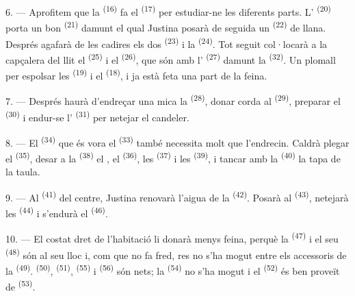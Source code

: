 6. --- Aprofitem que la  \textsuperscript{(16)} fa el
 \textsuperscript{(17)} per estudiar-ne les diferents parts.
L' \textsuperscript{(20)} porta un bon 
\textsuperscript{(21)} damunt el qual Justina posarà de seguida un
 \textsuperscript{(22)} de llana. Després agafarà de les cadires
els dos  \textsuperscript{(23)} i la 
\textsuperscript{(24)}. Tot seguit col·locarà a la capçalera del llit el
 \textsuperscript{(25)} i el 
\textsuperscript{(26)}, que són amb l' \textsuperscript{(27)}
damunt la  \textsuperscript{(32)}. Un plomall per espolsar
les  \textsuperscript{(19)} i el 
\textsuperscript{(18)}, i ja està feta una part de la feina.

7. --- Després haurà d'endreçar una mica la 
\textsuperscript{(28)}, donar corda al 
\textsuperscript{(29)}, preparar el  \textsuperscript{(30)} i
endur-se l' \textsuperscript{(31)} per netejar el candeler.

\VUsaut{5.0mm}
\VUsaut{3.0mm}

8. --- El  \textsuperscript{(34)} que és vora el 
\textsuperscript{(33)} també necessita molt que l'endrecin. Caldrà plegar el
 \textsuperscript{(35)}, desar a la 
\textsuperscript{(38)} el , el  \textsuperscript{(36)},
les  \textsuperscript{(37)} i les 
\textsuperscript{(39)}, i tancar amb la  \textsuperscript{(40)} la
tapa de la taula.

9. --- Al  \textsuperscript{(41)} del centre, Justina renovarà
l'aigua de la  \textsuperscript{(42)}. Posarà  al
 \textsuperscript{(43)}, netejarà les 
\textsuperscript{(44)} i s'endurà el 
\textsuperscript{(46)}.

10. --- El costat dret de l'habitació li donarà menys feina, perquè la
 \textsuperscript{(47)} i el seu 
\textsuperscript{(48)} són al seu lloc i, com que no fa fred, res no s'ha mogut
entre els accessoris de la  \textsuperscript{(49)}.
 \textsuperscript{(50)},  \textsuperscript{(51)},
 \textsuperscript{(55)} i 
\textsuperscript{(56)} són nets; la 
\textsuperscript{(54)} no s'ha mogut i el 
\textsuperscript{(52)} és ben proveït de  \textsuperscript{(53)}.

